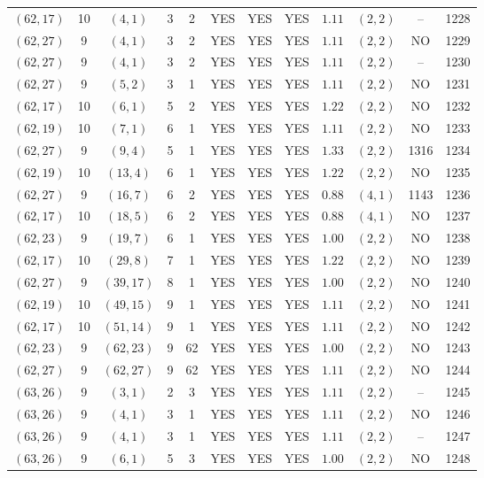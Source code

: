 \begin{longtable}{|c|c|c|c|c|c|c|c|c|c|c|c|}
$(62,17)$ & 10 & $(4,1)$ & 3 & 2 & YES & YES & YES & $1.11$ & $(2,2)$ & -- & 1228\\
$(62,27)$ & 9 & $(4,1)$ & 3 & 2 & YES & YES & YES & $1.11$ & $(2,2)$ & NO & 1229\\
$(62,27)$ & 9 & $(4,1)$ & 3 & 2 & YES & YES & YES & $1.11$ & $(2,2)$ & -- & 1230\\
$(62,27)$ & 9 & $(5,2)$ & 3 & 1 & YES & YES & YES & $1.11$ & $(2,2)$ & NO & 1231\\
$(62,17)$ & 10 & $(6,1)$ & 5 & 2 & YES & YES & YES & $1.22$ & $(2,2)$ & NO & 1232\\
$(62,19)$ & 10 & $(7,1)$ & 6 & 1 & YES & YES & YES & $1.11$ & $(2,2)$ & NO & 1233\\
$(62,27)$ & 9 & $(9,4)$ & 5 & 1 & YES & YES & YES & $1.33$ & $(2,2)$ & 1316 & 1234\\
$(62,19)$ & 10 & $(13,4)$ & 6 & 1 & YES & YES & YES & $1.22$ & $(2,2)$ & NO & 1235\\
$(62,27)$ & 9 & $(16,7)$ & 6 & 2 & YES & YES & YES & $0.88$ & $(4,1)$ & 1143 & 1236\\
$(62,17)$ & 10 & $(18,5)$ & 6 & 2 & YES & YES & YES & $0.88$ & $(4,1)$ & NO & 1237\\
$(62,23)$ & 9 & $(19,7)$ & 6 & 1 & YES & YES & YES & $1.00$ & $(2,2)$ & NO & 1238\\
$(62,17)$ & 10 & $(29,8)$ & 7 & 1 & YES & YES & YES & $1.22$ & $(2,2)$ & NO & 1239\\
$(62,27)$ & 9 & $(39,17)$ & 8 & 1 & YES & YES & YES & $1.00$ & $(2,2)$ & NO & 1240\\
$(62,19)$ & 10 & $(49,15)$ & 9 & 1 & YES & YES & YES & $1.11$ & $(2,2)$ & NO & 1241\\
$(62,17)$ & 10 & $(51,14)$ & 9 & 1 & YES & YES & YES & $1.11$ & $(2,2)$ & NO & 1242\\
$(62,23)$ & 9 & $(62,23)$ & 9 & 62 & YES & YES & YES & $1.00$ & $(2,2)$ & NO & 1243\\
$(62,27)$ & 9 & $(62,27)$ & 9 & 62 & YES & YES & YES & $1.11$ & $(2,2)$ & NO & 1244\\
$(63,26)$ & 9 & $(3,1)$ & 2 & 3 & YES & YES & YES & $1.11$ & $(2,2)$ & -- & 1245\\
$(63,26)$ & 9 & $(4,1)$ & 3 & 1 & YES & YES & YES & $1.11$ & $(2,2)$ & NO & 1246\\
$(63,26)$ & 9 & $(4,1)$ & 3 & 1 & YES & YES & YES & $1.11$ & $(2,2)$ & -- & 1247\\
$(63,26)$ & 9 & $(6,1)$ & 5 & 3 & YES & YES & YES & $1.00$ & $(2,2)$ & NO & 1248\\

\end{longtable}
